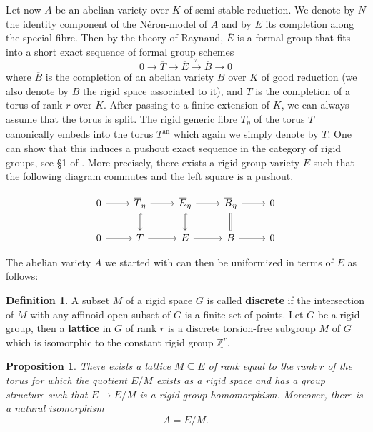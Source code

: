 \documentclass[10pt,oneside]{amsart}
\newtheorem{proposition}[theorem]{Proposition}
\theoremstyle{definition}
\newtheorem{definition}[theorem]{Definition}
\begin{document}
	Let now $A$ be an abelian variety over $K$ of semi-stable reduction. We denote by $N$ the identity component of the N\'eron-model of $A$ and by $\overline E$ its completion along the special fibre. Then by the theory of Raynaud, $\overline E$ is a formal group that fits into a short exact sequence of formal group schemes
	\begin{equation}\label{formal Raynaud extension}
	0\rightarrow \overline T \rightarrow \overline E \xrightarrow{\pi} \overline{B}\rightarrow 0
	\end{equation}
	where $\overline{B}$ is the completion of an abelian variety $B$ over $K$ of good reduction (we also denote by $B$ the rigid space associated to it), and $\overline{T}$ is the completion of a torus of rank $r$ over $K$.
	After passing to a finite extension of $K$, we can always assume that the torus is split. The rigid generic fibre $\overline{T}_\eta$ of the torus $\overline{T}$ canonically embeds into the torus $T^{\operatorname{an}}$ which again we simply denote by $T$. One can show that this induces a pushout exact sequence in the category of rigid groups, see \S 1 of \cite{BL}. More precisely, there exists a rigid group variety $E$ such that the following diagram commutes and the left square is a pushout.
	\begin{center}
		\begin{equation}
		\begin{tikzcd}
			0 \arrow[r] & \overline{T}_\eta \arrow[d, hook] \arrow[r] & \overline{E}_\eta \arrow[d, hook] \arrow[r] & \overline{B}_\eta \arrow[d,equal] \arrow[r] & 0 \\
			0 \arrow[r] & T \arrow[r] & E \arrow[r] & B \arrow[r] & 0
		\end{tikzcd}
		\end{equation}
	\end{center}
	
	The abelian variety $A$ we started with can then be uniformized in terms of $E$ as follows:
	
	\begin{definition}
		A subset $M$ of a rigid space $G$ is called \textbf{discrete} if the intersection of $M$ with any affinoid open subset of $G$ is a finite set of points.
		Let $G$ be a rigid group, then a \textbf{lattice} in $G$ of rank $r$ is a discrete torsion-free subgroup $M$ of $G$ which is isomorphic to the constant rigid group $\underline{\mathbb Z^r}$. 
	\end{definition}
	
	\begin{proposition}\label{Raynaud uniformisation}
		There exists a lattice $M \subseteq E$ of rank equal to the rank $r$ of the torus for which the quotient $E/M$ exists as a rigid space and has a group structure such that $E\rightarrow E/M$ is a rigid group homomorphism. Moreover, there is a natural isomorphism
		\[A=E/M.\]
	\end{proposition}
	
\end{document}
